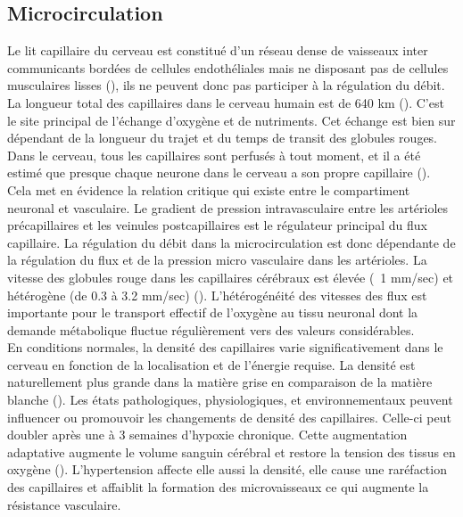 \subsection{Microcirculation}
Le lit capillaire du cerveau est constitué d’un réseau dense de vaisseaux inter communicants
bordées de cellules endothéliales mais ne disposant pas de cellules musculaires lisses (\cite{Rennels1975}), ils ne
peuvent donc pas participer à la régulation du débit. La longueur total des capillaires dans le cerveau
humain est de 640 km (\cite{Abbott2010}). C’est le site principal de l’échange d’oxygène et de nutriments. Cet échange
est bien sur dépendant de la longueur du trajet et du temps de transit des globules rouges. Dans le
cerveau, tous les capillaires sont perfusés à tout moment, et il a été estimé que presque chaque
neurone dans le cerveau a son propre capillaire (\cite{Zlokovic2005}). Cela met en évidence la relation critique qui existe
entre le compartiment neuronal et vasculaire. Le gradient de pression intravasculaire entre les
artérioles précapillaires et les veinules postcapillaires est le régulateur principal du flux capillaire. La
régulation du débit dans la microcirculation est donc dépendante de la régulation du flux et de la
pression micro vasculaire dans les artérioles. La vitesse des globules rouge dans les capillaires cérébraux est élevée (~1 mm/sec) et hétérogène (de 0.3 à 3.2 mm/sec) (\cite{Wei1993}). L’hétérogénéité des
vitesses des flux est importante pour le transport effectif de l’oxygène au tissu neuronal dont la
demande métabolique fluctue régulièrement vers des valeurs considérables.\\
En conditions normales, la densité des capillaires varie significativement dans le cerveau en
fonction de la localisation et de l’énergie requise. La densité est naturellement plus grande dans la
matière grise en comparaison de la matière blanche (\cite{Klein1986}). Les états pathologiques, physiologiques, et
environnementaux peuvent influencer ou promouvoir les changements de densité des capillaires.
Celle-ci peut doubler après une à 3 semaines d’hypoxie chronique. Cette augmentation adaptative
augmente le volume sanguin cérébral et restore la tension des tissus en oxygène (\cite{Cipolla2009}). L’hypertension
affecte elle aussi la densité, elle cause une raréfaction des capillaires et affaiblit la formation des
microvaisseaux ce qui augmente la résistance vasculaire.\\
